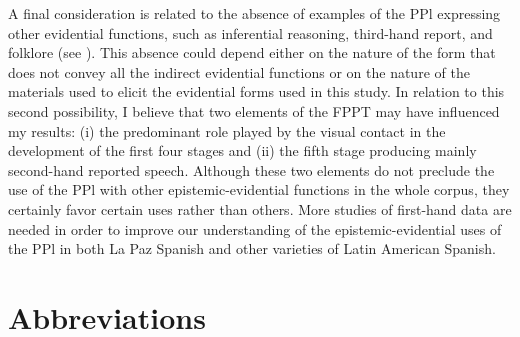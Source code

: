 \documentclass[output=paper]{langsci/langscibook}
\begin{document}
A final consideration is related to the absence of examples of the PPl expressing other evidential functions, such as inferential reasoning, third-hand report, and folklore (see \citealt{Aikhenvald2004}). This absence could depend either on the nature of the form that does not convey all the indirect evidential functions or on the nature of the materials used to elicit the evidential forms used in this study. In relation to this second possibility, I believe that two elements of the FPPT may have influenced my results: (i) the predominant role played by the visual contact in the development of the first four stages and (ii) the fifth stage producing mainly second-hand reported speech. Although these two elements do not preclude the use of the PPl with other epistemic-evidential functions in the whole corpus, they certainly favor certain uses rather than others. More studies of first-hand data are needed in order to improve our understanding of the epistemic-evidential uses of the PPl in both La Paz Spanish and other varieties of Latin American Spanish. 


\section*{Abbreviations}
\end{document}

